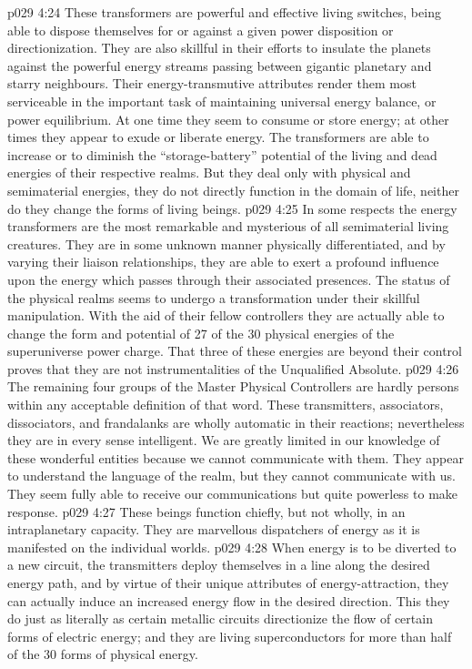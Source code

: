 \vs p029 4:24 These transformers are powerful and effective living switches, being able to dispose themselves for or against a given power disposition or directionization. They are also skillful in their efforts to insulate the planets against the powerful energy streams passing between gigantic planetary and starry neighbours. Their energy\hyp{}transmutive attributes render them most serviceable in the important task of maintaining universal energy balance, or power equilibrium. At one time they seem to consume or store energy; at other times they appear to exude or liberate energy. The transformers are able to increase or to diminish the “storage\hyp{}battery” potential of the living and dead energies of their respective realms. But they deal only with physical and semimaterial energies, they do not directly function in the domain of life, neither do they change the forms of living beings.
\vs p029 4:25 In some respects the energy transformers are the most remarkable and mysterious of all semimaterial living creatures. They are in some unknown manner physically differentiated, and by varying their liaison relationships, they are able to exert a profound influence upon the energy which passes through their associated presences. The status of the physical realms seems to undergo a transformation under their skillful manipulation.  With the aid of their fellow controllers they are actually able to change the form and potential of 27 of the 30 physical energies of the superuniverse power charge. That three of these energies are beyond their control proves that they are not instrumentalities of the Unqualified Absolute.
\vs p029 4:26 \pc The remaining four groups of the Master Physical Controllers are hardly persons within any acceptable definition of that word. These transmitters, associators, dissociators, and frandalanks are wholly automatic in their reactions; nevertheless they are in every sense intelligent. We are greatly limited in our knowledge of these wonderful entities because we cannot communicate with them. They appear to understand the language of the realm, but they cannot communicate with us. They seem fully able to receive our communications but quite powerless to make response.
\vs p029 4:27 \bibnobreakspace {} These beings function chiefly, but not wholly, in an intraplanetary capacity. They are marvellous dispatchers of energy as it is manifested on the individual worlds.
\vs p029 4:28 When energy is to be diverted to a new circuit, the transmitters deploy themselves in a line along the desired energy path, and by virtue of their unique attributes of energy\hyp{}attraction, they can actually induce an increased energy flow in the desired direction. This they do just as literally as certain metallic circuits directionize the flow of certain forms of electric energy; and they are living superconductors for more than half of the 30 forms of physical energy.
